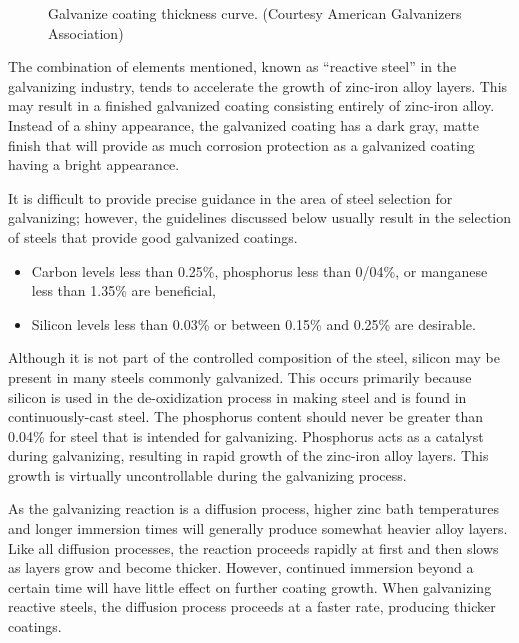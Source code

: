 \begin{figure}
  \caption{Galvanize coating thickness curve. (Courtesy American Galvanizers Association)}\label{fig:galvanize-coating-thickness-curve}
\end{figure}

The combination of elements mentioned, known as “reactive steel” in the galvanizing industry, tends to
accelerate the growth of zinc-iron alloy layers. This may result in a finished galvanized coating consisting entirely of
zinc-iron alloy. Instead of a shiny appearance, the galvanized coating has a dark gray, matte finish that will provide
as much corrosion protection as a galvanized coating having a bright appearance.

It is difficult to provide precise guidance in the area of steel selection for galvanizing; however, the guidelines
discussed below usually result in the selection of steels that provide good galvanized coatings.

\begin{itemize}
  \item Carbon levels less than 0.25\%, phosphorus less than 0/04\%, or manganese less than 1.35\% are beneficial,
  \item Silicon levels less than 0.03\% or between 0.15\% and 0.25\% are desirable.
\end{itemize}

Although it is not part of the controlled composition of the steel, silicon may be present in many steels
commonly galvanized. This occurs primarily because silicon is used in the de-oxidization process in making steel
and is found in continuously-cast steel. The phosphorus content should never be greater than 0.04\% for steel that is
intended for galvanizing. Phosphorus acts as a catalyst during galvanizing, resulting in rapid growth of the zinc-iron
alloy layers. This growth is virtually uncontrollable during the galvanizing process.

As the galvanizing reaction is a diffusion process, higher zinc bath temperatures and longer immersion times will
generally produce somewhat heavier alloy layers. Like all diffusion processes, the reaction proceeds rapidly at first
and then slows as layers grow and become thicker. However, continued immersion beyond a certain time will have
little effect on further coating growth. When galvanizing reactive steels, the diffusion process proceeds at a faster
rate, producing thicker coatings.

